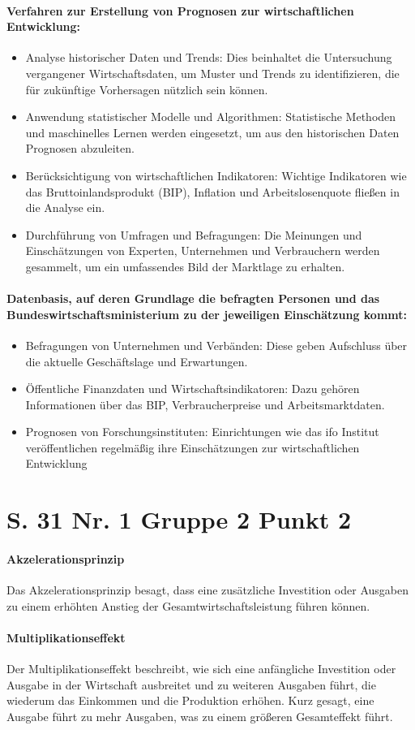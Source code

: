 \documentclass[12pt,a4paper]{report}
\begin{document}
	\paragraph{Verfahren zur Erstellung von Prognosen zur wirtschaftlichen Entwicklung:}
	\begin{itemize}
		\item Analyse historischer Daten und Trends: Dies beinhaltet die Untersuchung vergangener Wirtschaftsdaten, um Muster und Trends zu identifizieren, die für zukünftige Vorhersagen nützlich sein können.
		\item Anwendung statistischer Modelle und 				Algorithmen: Statistische Methoden und 				maschinelles Lernen werden eingesetzt, um aus 				den historischen Daten Prognosen abzuleiten.
		\item Berücksichtigung von wirtschaftlichen 				Indikatoren: Wichtige Indikatoren wie das 				Bruttoinlandsprodukt (BIP), Inflation und 				Arbeitslosenquote fließen in die Analyse ein.
		\item Durchführung von Umfragen und Befragungen: Die 				Meinungen und Einschätzungen von Experten, 				Unternehmen und Verbrauchern werden gesammelt, 				um ein umfassendes Bild der Marktlage zu 				erhalten.
	\end{itemize}
	\paragraph{Datenbasis, auf deren Grundlage die befragten Personen und das Bundeswirtschaftsministerium zu der jeweiligen Einschätzung kommt:}
	\begin{itemize}
		\item Befragungen von Unternehmen und Verbänden: 				Diese geben Aufschluss über die aktuelle 				Geschäftslage und Erwartungen.
		\item Öffentliche Finanzdaten und 				Wirtschaftsindikatoren: Dazu gehören 				Informationen über das BIP, Verbraucherpreise 				und Arbeitsmarktdaten.
		\item Prognosen von Forschungsinstituten: 				Einrichtungen wie das ifo Institut 				veröffentlichen regelmäßig ihre Einschätzungen 				zur wirtschaftlichen Entwicklung
	\end{itemize}
	\section{S. 31 Nr. 1 Gruppe 2 Punkt 2}
	\paragraph{Akzelerationsprinzip} Das Akzelerationsprinzip besagt, dass eine zusätzliche Investition oder Ausgaben zu einem erhöhten Anstieg der Gesamtwirtschaftsleistung führen können. 
	\paragraph{Multiplikationseffekt}
Der Multiplikationseffekt beschreibt, wie sich eine anfängliche Investition oder Ausgabe in der Wirtschaft ausbreitet und zu weiteren Ausgaben führt, die wiederum das Einkommen und die Produktion erhöhen. Kurz gesagt, eine Ausgabe führt zu mehr Ausgaben, was zu einem größeren Gesamteffekt führt.
\end{document}
